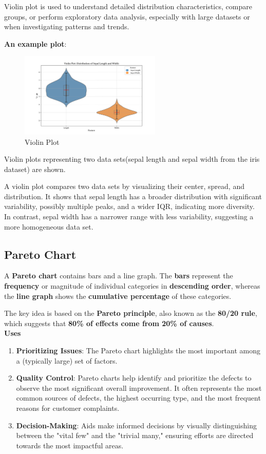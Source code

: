 \documentclass{article}
\begin{document}
Violin plot is used to understand detailed distribution characteristics, compare groups, or perform exploratory data analysis, especially with large datasets or when investigating patterns and trends.

\textbf{An example plot}:
\begin{figure}[H]
    \centering
    \includegraphics[width=0.6\textwidth]{assets/plots/violin_plot.png}
    \caption{Violin Plot}
    \label{fig:violin_plot}
\end{figure}

Violin plots representing two data sets(sepal length and sepal width from the iris dataset) are shown.

A violin plot compares two data sets by visualizing their center, spread, and distribution. It shows that sepal length has a broader distribution with significant variability, possibly multiple peaks, and a wider IQR, indicating more diversity. In contrast, sepal width has a narrower range with less variability, suggesting a more homogeneous data set.

\subsection{Pareto Chart}
A \textbf{Pareto chart} contains bars and a line graph. The \textbf{bars} represent the \textbf{frequency} or magnitude of individual categories in \textbf{descending order}, whereas the \textbf{line graph} shows the \textbf{cumulative percentage} of these categories.

The key idea is based on the \textbf{Pareto principle}, also known as the \textbf{80/20 rule}, which suggests that \textbf{80\% of effects come from 20\% of causes}.\\[6pt]
\textbf{\large Uses}
\begin{enumerate}
    \item \textbf{Prioritizing Issues}: The Pareto chart highlights the most important among a (typically large) set of factors.
    \item \textbf{Quality Control}: Pareto charts help identify and prioritize the defects to observe the most significant overall improvement. It often represents the most common sources of defects, the highest occurring type, and the most frequent reasons for customer complaints.
    \item \textbf{Decision-Making}: Aids make informed decisions by visually distinguishing between the "vital few" and the "trivial many," ensuring efforts are directed towards the most impactful areas.
\end{enumerate}
\end{document}
